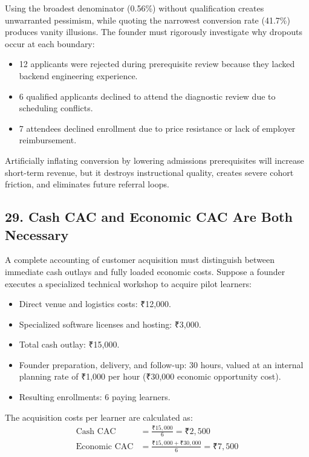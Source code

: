 Using the broadest denominator (0.56\%) without qualification creates unwarranted pessimism, while quoting the narrowest conversion rate (41.7\%) produces vanity illusions. The founder must rigorously investigate why dropouts occur at each boundary:
\begin{itemize}[leftmargin=*,itemsep=1pt]
  \item 12 applicants were rejected during prerequisite review because they lacked backend engineering experience.
  \item 6 qualified applicants declined to attend the diagnostic review due to scheduling conflicts.
  \item 7 attendees declined enrollment due to price resistance or lack of employer reimbursement.
\end{itemize}

Artificially inflating conversion by lowering admissions prerequisites will increase short-term revenue, but it destroys instructional quality, creates severe cohort friction, and eliminates future referral loops.

\subsection*{29. Cash CAC and Economic CAC Are Both Necessary}

A complete accounting of customer acquisition must distinguish between immediate cash outlays and fully loaded economic costs. Suppose a founder executes a specialized technical workshop to acquire pilot learners:
\begin{itemize}[leftmargin=*,itemsep=1pt]
  \item Direct venue and logistics costs: ₹12,000.
  \item Specialized software licenses and hosting: ₹3,000.
  \item Total cash outlay: ₹15,000.
  \item Founder preparation, delivery, and follow-up: 30 hours, valued at an internal planning rate of ₹1,000 per hour (₹30,000 economic opportunity cost).
  \item Resulting enrollments: 6 paying learners.
\end{itemize}

The acquisition costs per learner are calculated as:
\begin{align*}
  \text{Cash CAC} &= \frac{\text{₹}15,000}{6} = \text{₹}2,500 \\
  \text{Economic CAC} &= \frac{\text{₹}15,000 + \text{₹}30,000}{6} = \text{₹}7,500
\end{align*}

